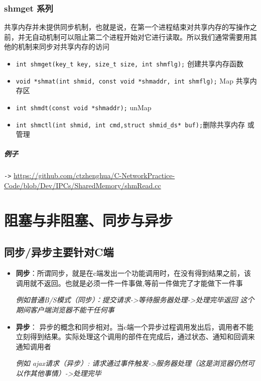 \documentclass[UTF8,a4paper,8pt]{ctexbook}
\begin{document}
		\subsubsection{shmget 系列}
			共享内存并未提供同步机制，也就是说，在第一个进程结束对共享内存的写操作之前，并无自动机制可以阻止第二个进程开始对它进行读取。所以我们通常需要用其他的机制来同步对共享内存的访问
			
			\begin{itemize}
				\item \verb|int shmget(key_t key, size_t size, int shmflg);| 创建共享内存函数
				\item \verb|void *shmat(int shmid, const void *shmaddr, int shmflg);| Map 共享内存区
				\item \verb|int shmdt(const void *shmaddr);| unMap
				\item \verb|int shmctl(int shmid, int cmd,struct shmid_ds* buf);|删除共享内存  或管理
			\end{itemize}
			
			\subparagraph{例子}\verb|->|
				\url{https://github.com/ctzhenghua/C-NetworkPractice-Code/blob/Dev/IPCs/SharedMemory/shmRead.cc}
			
	\section{阻塞与非阻塞、同步与异步}
		\subsection{同步/异步主要针对C端}
			\begin{itemize}
				\item \textbf{同步}：所谓同步，就是在c端发出一个功能调用时，在没有得到结果之前，该调用就不返回。也就是必须一件一件事做,等前一件做完了才能做下一件事
				
				\textit{例如普通B/S模式（同步）：提交请求->等待服务器处理->处理完毕返回 这个期间客户端浏览器不能干任何事}
				\item \textbf{异步}：  异步的概念和同步相对。当c端一个异步过程调用发出后，调用者不能立刻得到结果。实际处理这个调用的部件在完成后，通过状态、通知和回调来通知调用者
				
				\textit{例如 ajax请求（异步）: 请求通过事件触发->服务器处理（这是浏览器仍然可以作其他事情）->处理完毕}
			\end{itemize}
		
\end{document}
